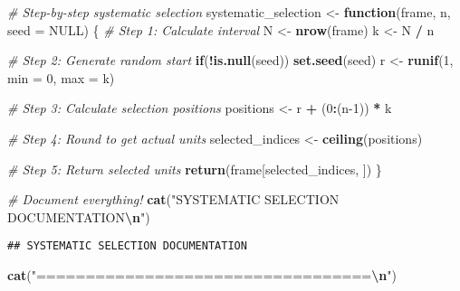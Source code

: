 \documentclass[
]{article}
\newenvironment{Shaded}{\begin{snugshade}}{\end{snugshade}}
\newcommand{\AttributeTok}[1]{\textcolor[rgb]{0.13,0.29,0.53}{#1}}
\newcommand{\CommentTok}[1]{\textcolor[rgb]{0.56,0.35,0.01}{\textit{#1}}}
\newcommand{\ConstantTok}[1]{\textcolor[rgb]{0.56,0.35,0.01}{#1}}
\newcommand{\ControlFlowTok}[1]{\textcolor[rgb]{0.13,0.29,0.53}{\textbf{#1}}}
\newcommand{\DecValTok}[1]{\textcolor[rgb]{0.00,0.00,0.81}{#1}}
\newcommand{\FunctionTok}[1]{\textcolor[rgb]{0.13,0.29,0.53}{\textbf{#1}}}
\newcommand{\NormalTok}[1]{#1}
\newcommand{\OtherTok}[1]{\textcolor[rgb]{0.56,0.35,0.01}{#1}}
\newcommand{\SpecialCharTok}[1]{\textcolor[rgb]{0.81,0.36,0.00}{\textbf{#1}}}
\newcommand{\StringTok}[1]{\textcolor[rgb]{0.31,0.60,0.02}{#1}}
\begin{document}
\begin{Shaded}
\begin{Highlighting}[]
\CommentTok{\# Step{-}by{-}step systematic selection}
\NormalTok{systematic\_selection }\OtherTok{\textless{}{-}} \ControlFlowTok{function}\NormalTok{(frame, n, }\AttributeTok{seed =} \ConstantTok{NULL}\NormalTok{) \{}
  \CommentTok{\# Step 1: Calculate interval}
\NormalTok{  N }\OtherTok{\textless{}{-}} \FunctionTok{nrow}\NormalTok{(frame)}
\NormalTok{  k }\OtherTok{\textless{}{-}}\NormalTok{ N }\SpecialCharTok{/}\NormalTok{ n}
  
  \CommentTok{\# Step 2: Generate random start}
  \ControlFlowTok{if}\NormalTok{(}\SpecialCharTok{!}\FunctionTok{is.null}\NormalTok{(seed)) }\FunctionTok{set.seed}\NormalTok{(seed)}
\NormalTok{  r }\OtherTok{\textless{}{-}} \FunctionTok{runif}\NormalTok{(}\DecValTok{1}\NormalTok{, }\AttributeTok{min =} \DecValTok{0}\NormalTok{, }\AttributeTok{max =}\NormalTok{ k)}
  
  \CommentTok{\# Step 3: Calculate selection positions}
\NormalTok{  positions }\OtherTok{\textless{}{-}}\NormalTok{ r }\SpecialCharTok{+}\NormalTok{ (}\DecValTok{0}\SpecialCharTok{:}\NormalTok{(n}\DecValTok{{-}1}\NormalTok{)) }\SpecialCharTok{*}\NormalTok{ k}
  
  \CommentTok{\# Step 4: Round to get actual units}
\NormalTok{  selected\_indices }\OtherTok{\textless{}{-}} \FunctionTok{ceiling}\NormalTok{(positions)}
  
  \CommentTok{\# Step 5: Return selected units}
  \FunctionTok{return}\NormalTok{(frame[selected\_indices, ])}
\NormalTok{\}}

\CommentTok{\# Document everything!}
\FunctionTok{cat}\NormalTok{(}\StringTok{"SYSTEMATIC SELECTION DOCUMENTATION}\SpecialCharTok{\textbackslash{}n}\StringTok{"}\NormalTok{)}
\end{Highlighting}
\end{Shaded}

\begin{verbatim}
## SYSTEMATIC SELECTION DOCUMENTATION
\end{verbatim}

\begin{Shaded}
\begin{Highlighting}[]
\FunctionTok{cat}\NormalTok{(}\StringTok{"==================================}\SpecialCharTok{\textbackslash{}n}\StringTok{"}\NormalTok{)}
\end{Highlighting}
\end{Shaded}
\end{document}
